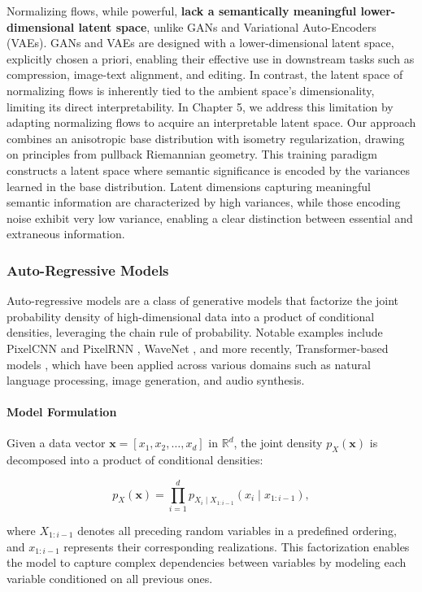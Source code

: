 Normalizing flows, while powerful, \textbf{lack a semantically meaningful lower-dimensional latent space}, unlike GANs and Variational Auto-Encoders (VAEs). GANs and VAEs are designed with a lower-dimensional latent space, explicitly chosen a priori, enabling their effective use in downstream tasks such as compression, image-text alignment, and editing. In contrast, the latent space of normalizing flows is inherently tied to the ambient space's dimensionality, limiting its direct interpretability. In Chapter 5, we address this limitation by adapting normalizing flows to acquire an interpretable latent space. Our approach combines an anisotropic base distribution with isometry regularization, drawing on principles from pullback Riemannian geometry. This training paradigm constructs a latent space where semantic significance is encoded by the variances learned in the base distribution. Latent dimensions capturing meaningful semantic information are characterized by high variances, while those encoding noise exhibit very low variance, enabling a clear distinction between essential and extraneous information.

\subsubsection{Auto-Regressive Models}\label{sec:auto_regressive_models}

Auto-regressive models are a class of generative models that factorize the joint probability density of high-dimensional data into a product of conditional densities, leveraging the chain rule of probability. Notable examples include PixelCNN and PixelRNN \cite{oord2016pixel}, WaveNet \cite{vanwavenet2016}, and more recently, Transformer-based models \cite{vaswani2017attention}, which have been applied across various domains such as natural language processing, image generation, and audio synthesis.

\paragraph{Model Formulation}

Given a data vector \( \mathbf{x} = [x_1, x_2, \dots, x_d] \) in \( \mathbb{R}^d \), the joint density \( p_X(\mathbf{x}) \) is decomposed into a product of conditional densities:

\[
p_X(\mathbf{x}) = \prod_{i=1}^{d} p_{X_i \mid X_{1:i-1}}(x_i \mid x_{1:i-1}),
\]

\noindent where \( X_{1:i-1} \) denotes all preceding random variables in a predefined ordering, and \( x_{1:i-1} \) represents their corresponding realizations. This factorization enables the model to capture complex dependencies between variables by modeling each variable conditioned on all previous ones.


